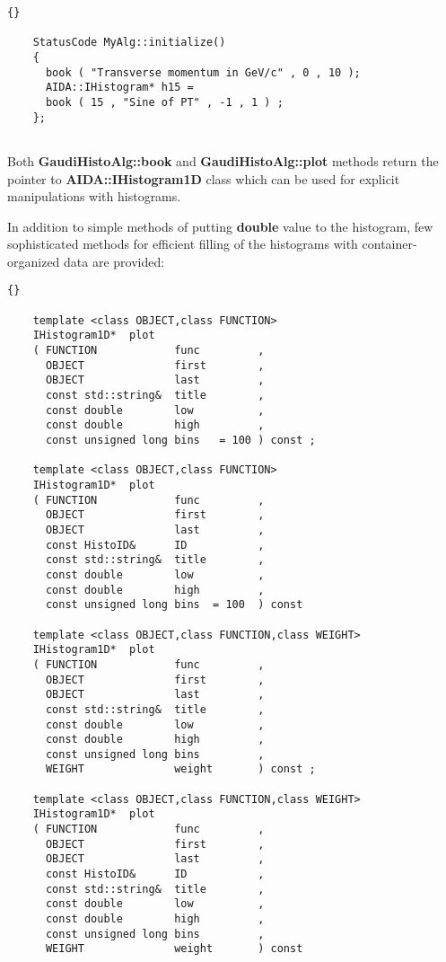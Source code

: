 \documentclass{lhcbnote}
\newcommand{\bftt}         {\ttfamily\bfseries}
\begin{document}
\begin{scriptsize}
 \begin{lstlisting}{}

    StatusCode MyAlg::initialize() 
    {
      book ( "Transverse momentum in GeV/c" , 0 , 10 );
      AIDA::IHistogram* h15 = 
      book ( 15 , "Sine of PT" , -1 , 1 ) ;
    };
    
 \end{lstlisting}
\end{scriptsize}

Both {\bftt{GaudiHistoAlg::book}}
and {\bftt{GaudiHistoAlg::plot}} methods return 
the pointer to  {\bftt{ AIDA::IHistogram1D}} 
class which can be used for explicit manipulations 
with histograms.

In addition to simple methods of putting {\bftt{double}}
value to the histogram, few sophisticated methods for 
efficient filling of the  histograms with container-organized data are
provided:

\begin{scriptsize}
  \begin{lstlisting}{}
    
    template <class OBJECT,class FUNCTION>
    IHistogram1D*  plot 
    ( FUNCTION            func         ,
      OBJECT              first        , 
      OBJECT              last         , 
      const std::string&  title        ,
      const double        low          ,
      const double        high         ,
      const unsigned long bins   = 100 ) const ;

    template <class OBJECT,class FUNCTION>
    IHistogram1D*  plot 
    ( FUNCTION            func         ,
      OBJECT              first        , 
      OBJECT              last         , 
      const HistoID&      ID           ,
      const std::string&  title        ,
      const double        low          ,
      const double        high         ,
      const unsigned long bins  = 100  ) const 

    template <class OBJECT,class FUNCTION,class WEIGHT>
    IHistogram1D*  plot 
    ( FUNCTION            func         ,
      OBJECT              first        , 
      OBJECT              last         , 
      const std::string&  title        ,
      const double        low          ,
      const double        high         ,
      const unsigned long bins         , 
      WEIGHT              weight       ) const ;

    template <class OBJECT,class FUNCTION,class WEIGHT>
    IHistogram1D*  plot 
    ( FUNCTION            func         ,
      OBJECT              first        , 
      OBJECT              last         , 
      const HistoID&      ID           ,
      const std::string&  title        ,
      const double        low          ,
      const double        high         ,
      const unsigned long bins         , 
      WEIGHT              weight       ) const   

 \end{lstlisting}
\end{scriptsize}
\end{document}
